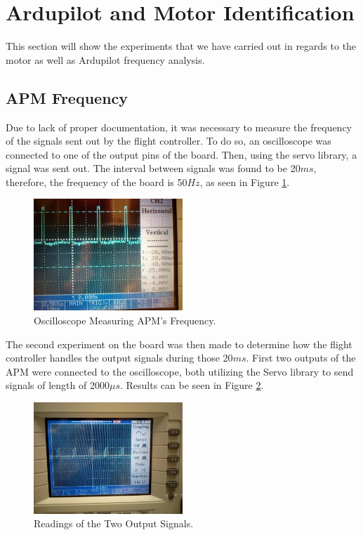 \section{Ardupilot and Motor Identification}
This section will show the experiments that we have carried out in regards to the motor as well as Ardupilot frequency analysis.

\subsection{APM Frequency}
Due to lack of proper documentation, it was necessary to measure the frequency of the signals sent out by the flight controller. To do so, an oscilloscope was connected to one of the output pins of the board. Then, using the servo library, a signal was sent out. The interval between signals was found to be 20$ms$, therefore, the frequency of the board is 50$Hz$, as seen in Figure \ref{oscillo1}.
\begin{figure}[H]
  \centering
    \includegraphics[width=0.5\textwidth]{images/oscillo1.jpg}
	\caption{Oscilloscope Measuring APM's Frequency.}
	\label{oscillo1}
\end{figure}

The second experiment on the board was then made to determine how the flight controller handles the output signals during those 20$ms$. First two outputs of the APM were connected to the oscilloscope, both utilizing the Servo library to send signals of length of 2000$\mu s$. Results can be seen in Figure \ref{oscillo2}.
\begin{figure}[H]
  \centering
    \includegraphics[width=0.5\textwidth]{images/oscillo2.jpg}
	\caption{Readings of the Two Output Signals.}
	\label{oscillo2}
\end{figure}

